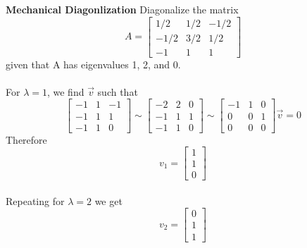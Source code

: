 \documentclass[letter]{article}
\newenvironment{menumerate}{\edef\backupindent{\the\parindent}
  \enumerate\setlength{\parindent}{\backupindent}}
  {\endenumerate}
\begin{document}
\begin{menumerate}
    \newpage
    \item \textbf{Mechanical Diagonlization} Diagonalize the matrix
    \begin{equation*}
        A =
        \begin{bmatrix}
            1/2&1/2&-1/2\\
            -1/2&3/2&1/2\\
            -1&1&1
        \end{bmatrix}
    \end{equation*}
    given that A has eigenvalues 1, 2, and 0.\\
    \\
    For $\lambda = 1$, we find $\vec{v}$ such that
         \begin{equation*}
            \begin{bmatrix}
                -1 & 1 & -1 \\
                -1 & 1 & 1 \\
                -1 & 1 & 0
            \end{bmatrix} \sim
            \begin{bmatrix}
                -2 & 2 & 0 \\
                -1 & 1 & 1 \\
                -1 & 1 & 0
            \end{bmatrix} \sim
            \begin{bmatrix}
                -1 & 1 & 0 \\
                0 & 0 & 1 \\
                0 & 0 & 0
            \end{bmatrix}
            \vec{v} = 0
         \end{equation*}
         Therefore
         \begin{equation*}
            v_1 = \begin{bmatrix}
                 1 \\ 1 \\ 0
            \end{bmatrix}
         \end{equation*}
        \\Repeating for $\lambda = 2$ we get
         \begin{equation*}
            v_2 = \begin{bmatrix}
                0 \\ 1 \\ 1
            \end{bmatrix}
         \end{equation*}

\end{menumerate}
\end{document}
